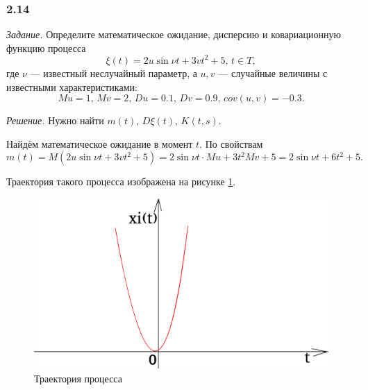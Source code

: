 \subsubsection*{2.14}

\textit{Задание.}
Определите математическое ожидание, дисперсию и ковариационную функцию процесса
$$ \xi \left( t \right) =
  2u \sin \nu t + 3vt^2 + 5, \,
  t \in T,$$
где $ \nu $ --- известный неслучайный параметр, а $u, v$ ---
случайные величины с известными характеристиками:
$$Mu = 1, \,
  Mv = 2, \,
  Du = 0.1, \,
  Dv = 0.9, \,
  cov \left( u, v \right) = -0.3.$$

\textit{Решение.}
Нужно найти $m \left( t \right), \, D \xi \left( t \right), \, K \left( t, s \right) $.

Найдём математическое ожидание в момент $t$.
По свойствам
$$m \left( t \right) =
  M \left( 2u \sin \nu t + 3vt^2 + 5 \right) =
  2 \sin \nu t \cdot Mu + 3t^2 Mv + 5 =
  2 \sin \nu t + 6t^2 + 5.$$

Траектория такого процесса изображена на рисунке \ref{fig:214}.

\begin{figure}[h!]
 \centering
 \includegraphics[width=.5\textwidth]{./pictures/2_14.png}
 \caption{Траектория процесса}
 \label{fig:214}
\end{figure}

